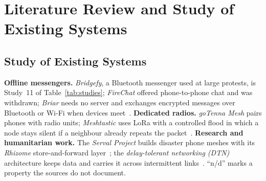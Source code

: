 \section{Literature Review and Study of Existing Systems}
\label{ch:lit}

\subsection{Study of Existing Systems}
\textbf{Offline messengers.} \emph{Bridgefy}, a Bluetooth messenger used at large protests, is Study~11 of Table~\ref{tab:studies}; \emph{FireChat} offered phone-to-phone chat and was withdrawn; \emph{Briar} needs no server and exchanges encrypted messages over Bluetooth or Wi-Fi when devices meet~\cite{briar}. \textbf{Dedicated radios.} \emph{goTenna Mesh} pairs phones with radio units; \emph{Meshtastic} uses LoRa with a controlled flood in which a node stays silent if a neighbour already repeats the packet~\cite{meshtastic}. \textbf{Research and humanitarian work.} The \emph{Serval Project} builds disaster phone meshes with its \emph{Rhizome} store-and-forward layer~\cite{serval}; the \emph{delay-tolerant networking (DTN)} architecture keeps data and carries it across intermittent links~\cite{fall2003dtn,rfc4838}. ``n/d'' marks a property the sources do not document.
